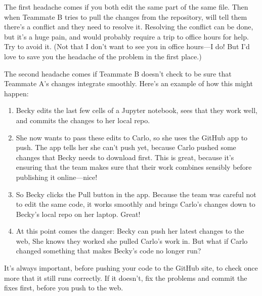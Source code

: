 \documentclass[letterpaper,10pt,english]{jupyterBook}
\begin{document}
\sphinxAtStartPar
The first headache comes if you both edit the same part of the same file.  Then when Teammate B tries to pull the changes from the repository,  will tell them there’s a conflict and they need to resolve it.  Resolving the conflict can be done, but it’s a huge pain, and would probably require a trip to office hours for help.  Try to avoid it.  (Not that I don’t want to see you in office hours—I do!  But I’d love to save you the headache of the problem in the first place.)

\sphinxAtStartPar
The second headache comes if Teammate B doesn’t check to be sure that Teammate A’s changes integrate smoothly.  Here’s an example of how this might happen:
\begin{enumerate}
%
\item {} 
\sphinxAtStartPar
Becky edits the last few cells of a Jupyter notebook, sees that they work well, and commits the changes to her local repo.

\item {} 
\sphinxAtStartPar
She now wants to pass these edits to Carlo, so she uses the GitHub app to push.  The app tells her she can’t push yet, because Carlo pushed some changes that Becky needs to download first.  This is great, because it’s ensuring that the team makes sure that their work combines sensibly before publishing it online—nice!

\item {} 
\sphinxAtStartPar
So Becky clicks the Pull button in the app.  Because the team was careful not to edit the same code, it works smoothly and brings Carlo’s changes down to Becky’s local repo on her laptop.  Great!

\item {} 
\sphinxAtStartPar
At this point comes the danger:  Becky can push her latest changes to the web,   She knows they worked  she pulled Carlo’s work in.  But what if Carlo changed something that makes Becky’s code no longer run?

\end{enumerate}

\sphinxAtStartPar
It’s always important, before pushing your code to the GitHub site, to check once more that it still runs correctly.  If it doesn’t, fix the problems and commit the fixes first, before you push to the web.
\end{document}
